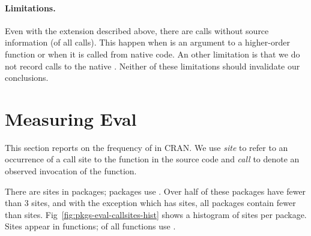 \documentclass[screen,acmsmall]{acmart}%
\begin{document}
\paragraph{Limitations.} Even with the extension described above, there are
\PkgUndefinedRnd \eval calls without source information (\PkgUndefinedRatio of
all \eval calls). This happen when \eval is an argument to a higher-order
function or when it is called from native code. An other limitation is that we
do not record calls to the native \eval. Neither of these limitations should
invalidate our conclusions.

\section{Measuring Eval}

This section reports on the frequency of \eval in CRAN. We use \emph{site} to
refer to an occurrence of a call site to the \eval function in the source code
and \emph{call} to denote an observed invocation of the \eval function.

There are \PkgEvalCallSites \eval sites in \PkgPackages packages;
\PkgPackagesRatio packages use \eval. Over half of these packages have fewer
than 3 sites, and with the exception \MaxEvalCallSitesPackage which has
\MaxEvalCallSitesCount sites, all packages contain fewer than
\MaxEvalCallSitesRest sites. Fig~\ref{fig:pkgs-eval-callsites-hist} shows a
histogram of sites per package. Sites appear in \PkgFunsWithEval functions;
\CranFunsWithEvalRatio of all functions use \eval.
\end{document}
